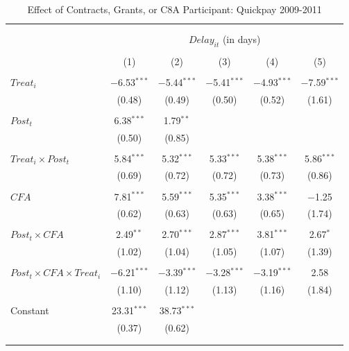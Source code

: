 \documentclass[
]{article}
\begin{document}
\begin{table}[H] \centering 
  \caption{Effect of Contracts, Grants, or C8A Participant: Quickpay 2009-2011} 
  \label{} 
\small 
\begin{tabular}{@{\extracolsep{-2pt}}lccccc} 
\\[-1.8ex]\hline 
\hline \\[-1.8ex] 
\\[-1.8ex] & \multicolumn{5}{c}{$Delay_{it}$ (in days)} \\ 
\\[-1.8ex] & (1) & (2) & (3) & (4) & (5)\\ 
\hline \\[-1.8ex] 
 $Treat_i$ & $-$6.53$^{***}$ & $-$5.44$^{***}$ & $-$5.41$^{***}$ & $-$4.93$^{***}$ & $-$7.59$^{***}$ \\ 
  & (0.48) & (0.49) & (0.50) & (0.52) & (1.61) \\ 
  & & & & & \\ 
 $Post_t$ & 6.38$^{***}$ & 1.79$^{**}$ &  &  &  \\ 
  & (0.50) & (0.85) &  &  &  \\ 
  & & & & & \\ 
 $Treat_i \times Post_t$ & 5.84$^{***}$ & 5.32$^{***}$ & 5.33$^{***}$ & 5.38$^{***}$ & 5.86$^{***}$ \\ 
  & (0.69) & (0.72) & (0.72) & (0.73) & (0.86) \\ 
  & & & & & \\ 
 $CFA$ & 7.81$^{***}$ & 5.59$^{***}$ & 5.35$^{***}$ & 3.38$^{***}$ & $-$1.25 \\ 
  & (0.62) & (0.63) & (0.63) & (0.65) & (1.74) \\ 
  & & & & & \\ 
 $Post_t \times CFA$ & 2.49$^{**}$ & 2.70$^{***}$ & 2.87$^{***}$ & 3.81$^{***}$ & 2.67$^{*}$ \\ 
  & (1.02) & (1.04) & (1.05) & (1.07) & (1.39) \\ 
  & & & & & \\ 
 $Post_t \times CFA \times Treat_i$ & $-$6.21$^{***}$ & $-$3.39$^{***}$ & $-$3.28$^{***}$ & $-$3.19$^{***}$ & 2.58 \\ 
  & (1.10) & (1.12) & (1.13) & (1.16) & (1.84) \\ 
  & & & & & \\ 
 Constant & 23.31$^{***}$ & 38.73$^{***}$ &  &  &  \\ 
  & (0.37) & (0.62) &  &  &  \\ 
  & & & & & \\ 
\hline \\[-1.8ex] 

\end{tabular}
\end{table}
\end{document}

